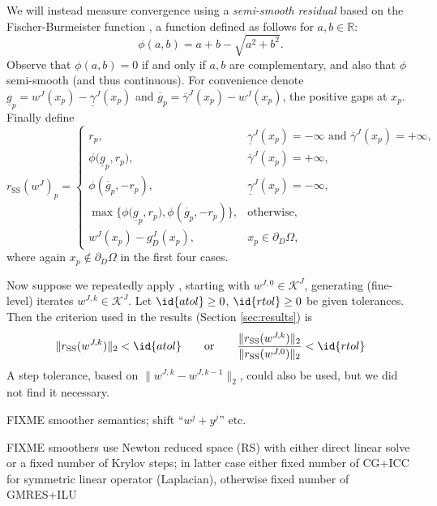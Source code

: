 \documentclass[letterpaper,final,12pt,reqno]{amsart}
\theoremstyle{cstyle}
\theoremstyle{cstyle*}
\theoremstyle{dstyle}
\numberwithin{equation}{section}
\numberwithin{figure}{section}
\numberwithin{table}{section}
\numberwithin{theorem}{section}
\newcommand{\RR}{\mathbb{R}}
\newcommand{\rSS}{r_{\text{SS}}}
\begin{document}
We will instead measure convergence using a \emph{semi-smooth residual} based on the Fischer-Burmeister function \cite{BensonMunson2006,Ulbrich2011}, a function defined as follows for $a,b\in\RR$:
\begin{equation}
\phi(a,b) = a + b - \sqrt{a^2 + b^2}. \label{eq:phiFB}
\end{equation}
Observe that $\phi(a,b)=0$ if and only if $a,b$ are complementary, and also that $\phi$ semi-smooth (and thus continuous).  For convenience denote $\underline{g}_p = w^J(x_p) - \underline{\gamma}^J(x_p)$ and $\overline{g}_p = \overline{\gamma}^J(x_p) - w^J(x_p)$, the positive gaps at $x_p$.  Finally define
\begin{equation}
\rSS(w^J)_p = \begin{cases}
r_p, & \underline{\gamma}^J(x_p) = -\infty \text{ and } \overline{\gamma}^J(x_p) = +\infty, \\
\phi\big(\underline{g}_p, r_p\big), & \overline{\gamma}^J(x_p) = +\infty, \\
\phi\left(\overline{g}_p, -r_p\right), & \underline{\gamma}^J(x_p) = -\infty, \\
\max\big\{\phi\big(\underline{g}_p, r_p\big), \phi\left(\overline{g}_p, -r_p\right)\big\}, & \text{otherwise}, \\
w^J(x_p) - g_D^J(x_p), & x_p \in \partial_D\Omega,
\end{cases} \label{eq:rSS}
\end{equation}
where again $x_p \notin \partial_D\Omega$ in the first four cases.

 
Now suppose we repeatedly apply , starting with $w^{J,0} \in \mathcal{K}^J$, generating (fine-level) iterates $w^{J,k} \in \mathcal{K}^J$.  Let $\id{atol}\ge 0$, $\id{rtol}\ge 0$ be given tolerances.  Then the criterion used in the results (Section \ref{sec:results}) is 
\begin{equation}
\|\rSS(w^{J,k})\|_2 < \id{atol} \qquad \text{or} \qquad \frac{\|\rSS(w^{J,k})\|_2}{\|\rSS(w^{J,0})\|_2} < \id{rtol} \label{eq:stoppingcriterion}
\end{equation}
A step tolerance, based on $\|w^{J,k} - w^{J,k-1}\|_2$, could also be used, but we did not find it necessary.

FIXME smoother semantics; shift ``$w^j+y^j$'' etc.

FIXME smoothers use Newton reduced space (RS) \cite{BensonMunson2006}with either direct linear solve or a fixed number of Krylov steps; in latter case either fixed number of CG+ICC for symmetric linear operator (Laplacian), otherwise fixed number of GMRES+ILU
\end{document}
